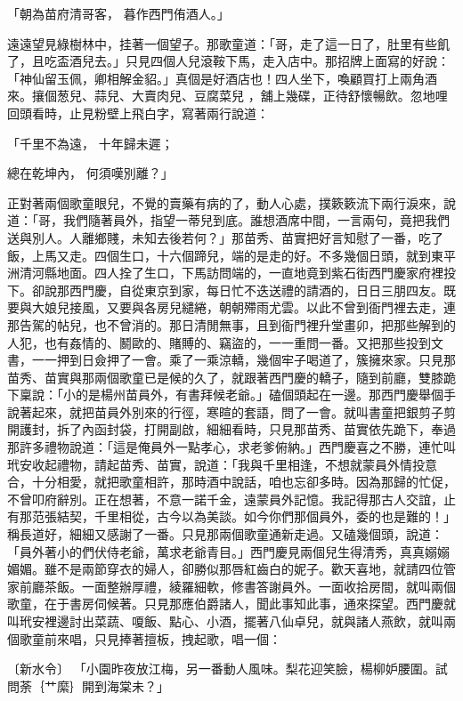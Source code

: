 「朝為苗府清哥客，  暮作西門侑酒人。」

遠遠望見綠樹林中，挂著一個望子。那歌童道：「哥，走了這一日了，肚里有些飢了，且吃盃酒兒去。」只見四個人兒滾鞍下馬，走入店中。那招牌上面寫的好說：「神仙留玉佩，卿相解金貂。」真個是好酒店也！四人坐下，喚顧買打上兩角酒來。攘個葱兒、蒜兒、大賣肉兒、豆腐菜兒 ，舖上幾碟，正待舒懷暢飲。忽地哩回頭看時，止見粉壁上飛白字，寫著兩行說道：

「千里不為遠，  十年歸未遲；

總在乾坤內，  何須嘆別離？」

正對著兩個歌童眼兒，不覺的賣藥有病的了，動人心處，撲簌簌流下兩行淚來，說道：「哥，我們隨著員外，指望一蒂兒到底。誰想酒席中間，一言兩句，竟把我們送與別人。人離鄉賤，未知去後若何？」那苗秀、苗實把好言知慰了一番，吃了飯，上馬又走。四個生口，十六個蹄兒，端的是走的好。不多幾個日頭，就到東平洲清河縣地面。四人拴了生口，下馬訪問端的，一直地竟到紫石街西門慶家府裡投下。卻說那西門慶，自從東京到家，每日忙不迭送禮的請酒的，日日三朋四友。既要與大娘兒接風，又要與各房兒繾綣，朝朝殢雨尤雲。以此不曾到衙門裡去走，連那告駕的帖兒，也不曾消的。那日清閒無事，且到衙門裡升堂畫卯，把那些解到的人犯，也有姦情的、鬭歐的、賭賻的、竊盜的，一一重問一番。又把那些投到文書，一一押到日僉押了一會。乘了一乘涼轎，幾個牢子喝道了，簇擁來家。只見那苗秀、苗實與那兩個歌童已是候的久了，就跟著西門慶的轎子，隨到前廳，雙膝跪下稟說：「小的是楊州苗員外，有書拜候老爺。」磕個頭起在一邊。那西門慶舉個手說著起來，就把苗員外別來的行徑，寒暄的套語，問了一會。就叫書童把銀剪子剪開護封，拆了內函封袋，打開副啟，細細看時，只見那苗秀、苗實依先跪下，奉過那許多禮物說道：「這是俺員外一點孝心，求老爹俯納。」西門慶喜之不勝，連忙叫玳安收起禮物，請起苗秀、苗實，說道：「我與千里相逢，不想就蒙員外情投意合，十分相愛，就把歌童相許，那時酒中說話，咱也忘卻多時。因為那歸的忙促，不曾叩府辭別。正在想著，不意一諾千金，遠蒙員外記憶。我記得那古人交誼，止有那范張結契，千里相從，古今以為美談。如今你們那個員外，委的也是難的！」稱長道好，細細又感謝了一番。只見那兩個歌童通新走過。又磕幾個頭，說道：「員外著小的們伏侍老爺，萬求老爺青目。」西門慶見兩個兒生得清秀，真真嫋嫋媚媚。雖不是兩節穿衣的婦人，卻勝似那唇紅齒白的妮子。歡天喜地，就請四位管家前廳茶飯。一面整辦厚禮，綾羅細軟，修書答謝員外。一面收拾房間，就叫兩個歌童，在于書房伺候著。只見那應伯爵諸人，聞此事知此事，通來探望。西門慶就叫玳安裡邊討出菜蔬、嗄飯、點心、小酒，擺著八仙卓兒，就與諸人燕飲，就叫兩個歌童前來唱，只見捧著擅板，拽起歌，唱一個：

〔新水令〕  「小園昨夜放江梅，另一番動人風味。梨花迎笑臉，楊柳妒腰圍。試問荼｛艹縻｝開到海棠未？」

